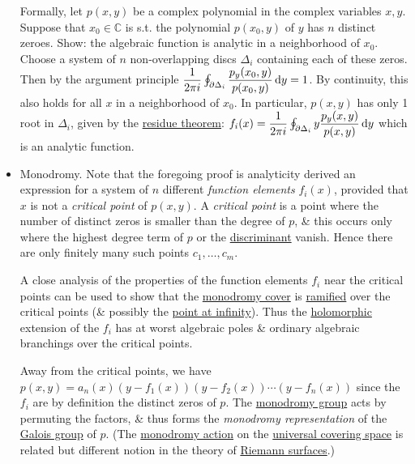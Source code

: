 \documentclass{article}
\begin{document}
\begin{itemize}
	Formally, let $p(x,y)$ be a complex polynomial in the complex variables $x,y$. Suppose that $x_0\in\mathbb{C}$ is s.t. the polynomial $p(x_0,y)$ of $y$ has $n$ distinct zeroes. Show: the algebraic function is analytic in a neighborhood of $x_0$. Choose a system of $n$ non-overlapping discs $\Delta_i$ containing each of these zeros. Then by the argument principle $\dfrac{1}{2\pi i}\oint_{\partial\Delta_i} \dfrac{p_y(x_0,y)}{p(x_0,y)}\,{\rm d}y = 1$. By continuity, this also holds for all $x$ in a neighborhood of $x_0$. In particular, $p(x,y)$ has only 1 root in $\Delta_i$, given by the \href{https://en.wikipedia.org/wiki/Residue_theorem}{residue theorem}: $f_i(x) = \dfrac{1}{2\pi i}\oint_{\partial\Delta_i} y\dfrac{p_y(x,y)}{p(x,y)}\,{\rm d}y$ which is an analytic function.
	\item {\sf Monodromy.} Note that the foregoing proof is analyticity derived an expression for a system of $n$ different {\it function elements} $f_i(x)$, provided that $x$ is not a {\it critical point} of $p(x,y)$. A {\it critical point} is a point where the number of distinct zeros is smaller than the degree of $p$, \& this occurs only where the highest degree term of $p$ or the \href{https://en.wikipedia.org/wiki/Discriminant}{discriminant} vanish. Hence there are only finitely many such points $c_1,\ldots,c_m$.
	
	A close analysis of the properties of the function elements $f_i$ near the critical points can be used to show that the \href{https://en.wikipedia.org/wiki/Monodromy_theorem}{monodromy cover} is \href{https://en.wikipedia.org/wiki/Ramification_(mathematics)}{ramified} over the critical points (\& possibly the \href{https://en.wikipedia.org/wiki/Riemann_sphere}{point at infinity}). Thus the \href{https://en.wikipedia.org/wiki/Holomorphic_function}{holomorphic} extension of the $f_i$ has at worst algebraic poles \& ordinary algebraic branchings over the critical points.
	
	Away from the critical points, we have $p(x,y) = a_n(x)(y - f_1(x))(y - f_2(x))\cdots(y - f_n(x))$ since the $f_i$ are by definition the distinct zeros of $p$. The \href{https://en.wikipedia.org/wiki/Monodromy_group}{monodromy group} acts by permuting the factors, \& thus forms the {\it monodromy representation} of the \href{https://en.wikipedia.org/wiki/Galois_group}{Galois group} of $p$. (The \href{https://en.wikipedia.org/wiki/Monodromy_action}{monodromy action} on the \href{https://en.wikipedia.org/wiki/Universal_covering_space}{universal covering space} is related but different notion in the theory of \href{https://en.wikipedia.org/wiki/Riemann_surface}{Riemann surfaces}.)
\end{itemize}
\end{document}
